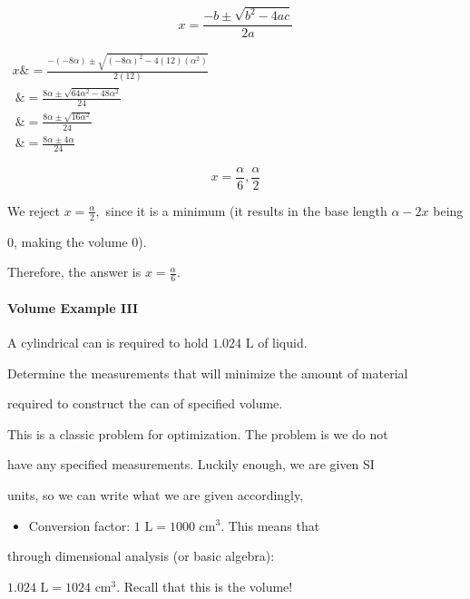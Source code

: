 $$x=\frac{-b\pm\sqrt{b^2-4ac}}{2a}$$



$\begin{aligned}

 x \&=\frac{-(-8\alpha)\pm\sqrt{(-8\alpha)^2-4(12)(\alpha^2)}}{2(12)} \\\ \&=\frac{8\alpha\pm\sqrt{64\alpha^2-48\alpha^2}}{24} \\\ \&=\frac{8\alpha\pm\sqrt{16\alpha^2}}{24} \\\ \&=\frac{8\alpha\pm 4\alpha}{24}

\end{aligned}$



$$x=\frac{\alpha}{6},\frac{\alpha}{2}$$



We reject $x=\frac{\alpha}{2},$ since it is a minimum (it results in the base length $\alpha-2x$ being

0, making the volume 0).



Therefore, the answer is $x=\frac{\alpha}{6}.$



\paragraph{Volume Example III}



A cylindrical can is required to hold $1.024\text{ L}$ of liquid.

Determine the measurements that will minimize the amount of material

required to construct the can of specified volume.



This is a classic problem for optimization. The problem is we do not

have any specified measurements. Luckily enough, we are given SI

units, so we can write what we are given accordingly,



\begin{itemize}
    \item Conversion factor: $1\text{ L}=1000\text{ cm}^{3}.$ This means that
\end{itemize}
    through dimensional analysis (or basic algebra):

    $1.024\text{ L}=1024\text{ cm}^{3}.$ Recall that this is the volume!

